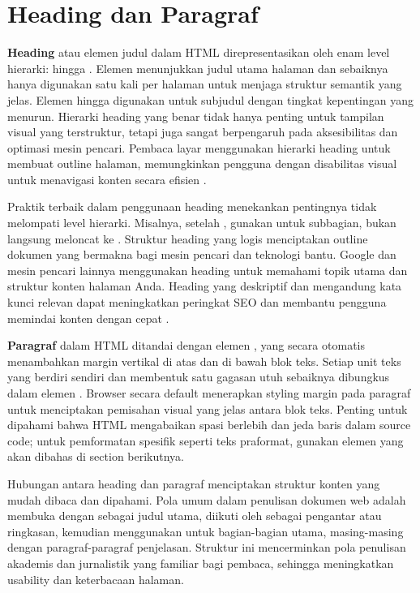 ﻿\section{Heading dan Paragraf}

\textbf{Heading} atau elemen judul dalam HTML direpresentasikan oleh enam level hierarki:  hingga . Elemen  menunjukkan judul utama halaman dan sebaiknya hanya digunakan satu kali per halaman untuk menjaga struktur semantik yang jelas. Elemen  hingga  digunakan untuk subjudul dengan tingkat kepentingan yang menurun. Hierarki heading yang benar tidak hanya penting untuk tampilan visual yang terstruktur, tetapi juga sangat berpengaruh pada aksesibilitas dan optimasi mesin pencari. Pembaca layar menggunakan hierarki heading untuk membuat outline halaman, memungkinkan pengguna dengan disabilitas visual untuk menavigasi konten secara efisien \cite{webdevHtml}.

Praktik terbaik dalam penggunaan heading menekankan pentingnya tidak melompati level hierarki. Misalnya, setelah , gunakan  untuk subbagian, bukan langsung meloncat ke . Struktur heading yang logis menciptakan outline dokumen yang bermakna bagi mesin pencari dan teknologi bantu. Google dan mesin pencari lainnya menggunakan heading untuk memahami topik utama dan struktur konten halaman Anda. Heading yang deskriptif dan mengandung kata kunci relevan dapat meningkatkan peringkat SEO dan membantu pengguna memindai konten dengan cepat \cite{mdnAccessibility}.

\textbf{Paragraf} dalam HTML ditandai dengan elemen , yang secara otomatis menambahkan margin vertikal di atas dan di bawah blok teks. Setiap unit teks yang berdiri sendiri dan membentuk satu gagasan utuh sebaiknya dibungkus dalam elemen . Browser secara default menerapkan styling margin pada paragraf untuk menciptakan pemisahan visual yang jelas antara blok teks. Penting untuk dipahami bahwa HTML mengabaikan spasi berlebih dan jeda baris dalam source code; untuk pemformatan spesifik seperti teks praformat, gunakan elemen  yang akan dibahas di section berikutnya.

Hubungan antara heading dan paragraf menciptakan struktur konten yang mudah dibaca dan dipahami. Pola umum dalam penulisan dokumen web adalah membuka dengan  sebagai judul utama, diikuti oleh  sebagai pengantar atau ringkasan, kemudian menggunakan  untuk bagian-bagian utama, masing-masing dengan paragraf-paragraf penjelasan. Struktur ini mencerminkan pola penulisan akademis dan jurnalistik yang familiar bagi pembaca, sehingga meningkatkan usability dan keterbacaan halaman.

